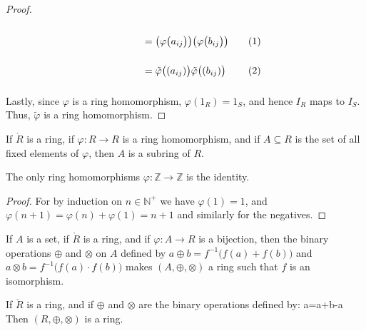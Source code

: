 \documentclass{book}                                                           %
\begin{document}
\begin{proof}
\begin{subequations}
\begin{minipage}[t]{0.44\textwidth}
\begin{align}
                            &=\big(\varphi\big(a_{ij}\big)\big)
                                \big(\varphi\big(b_{ij}\big)\big)
                                \vphantom{\Big(\sum_{k\in\mathbb{Z}_{n}}}\\
                            &=\tilde{\varphi}\big((a_{ij})\big)
                                \tilde{\varphi}\big((b_{ij})\big)
                                \vphantom{\Big(\sum_{k\in\mathbb{Z}_{n}}}
                        \end{align}
                    \end{minipage}
                \end{subequations}
                Lastly, since $\varphi$ is a ring homomorphism,
                $\varphi(1_{R})=1_{S}$, and hence $I_{R}$ maps to $I_{S}$.
                Thus, $\tilde{\varphi}$ is a ring homomorphism.
            \end{proof}
            \begin{theorem}
                If $\ring{R}$ is a ring, if $\varphi:R\rightarrow{R}$ is a
                ring homomorphism, and if $A\subseteq{R}$ is the set of all
                fixed elements of $\varphi$, then $A$ is a subring of $R$.
            \end{theorem}
            \begin{theorem}
                The only ring homomorphisms
                $\varphi:\mathbb{Z}\rightarrow\mathbb{Z}$ is the identity.
            \end{theorem}
            \begin{proof}
                For by induction on $n\in\mathbb{N}^{+}$ we have
                $\varphi(1)=1$, and $\varphi(n+1)=\varphi(n)+\varphi(1)=n+1$
                and similarly for the negatives.
            \end{proof}
            \begin{theorem}
                If $A$ is a set, if $\ring{R}$ is a ring, and if
                $\varphi:A\rightarrow{R}$ is a bijection, then the binary
                operations $\oplus$ and $\otimes$ on $A$ defined by
                $a\oplus{b}=f^{\minus{1}}\big(f(a)+f(b)\big)$ and
                $a\otimes{b}=f^{\minus{1}}\big(f(a)\cdot{f}(b)\big)$ makes
                $(A,\oplus,\otimes)$ a ring such that $f$ is an isomorphism.
            \end{theorem}
            \begin{theorem}
                If $\ring{R}$ is a ring, and if $\oplus$ and $\otimes$ are
                the binary operations defined by:
                            {a=a+b-a}
                Then $(R,\oplus,\otimes)$ is a ring.
            \end{theorem}
\end{document}
